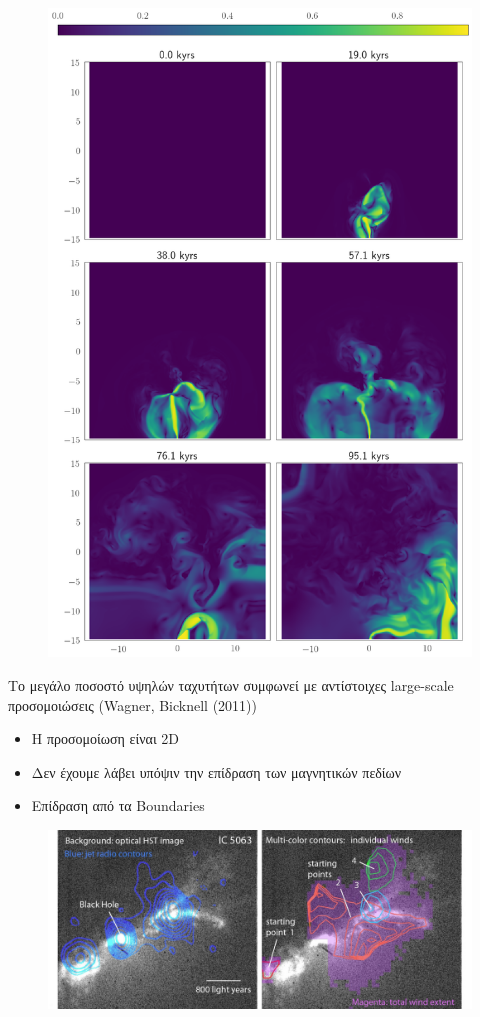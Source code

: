 \begin{figure}[h]
	\centering
	\includegraphics[width=1\linewidth]{DataImages/JetCloudV}
	\caption{}
	\label{fig:jetcloudv}
\end{figure}

Το μεγάλο ποσοστό υψηλών ταχυτήτων συμφωνεί με αντίστοιχες large-scale προσομοιώσεις (Wagner, Bicknell (2011))
\begin{itemize}
	\item{Η προσομοίωση είναι 2D}
	\item{Δεν έχουμε λάβει υπόψιν την επίδραση των μαγνητικών πεδίων}
	\item{Επίδραση από τα Boundaries}
\end{itemize}

\begin{figure}[h]
	\centering
	\includegraphics[width=1\linewidth]{../Presentation/Images/thejetofabla}
	\caption{}
	\label{fig:thejetofabla}
\end{figure}

